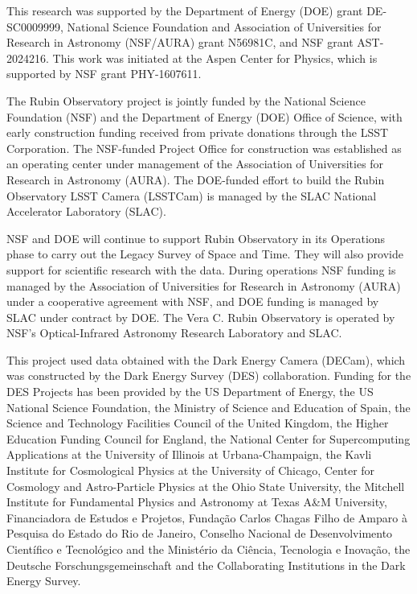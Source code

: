 \documentclass[twocolumn,trackchanges]{aastex63}
\begin{document}
This research was supported by the Department of Energy (DOE) grant DE-SC0009999, National Science Foundation and Association of Universities for Research in Astronomy (NSF/AURA) grant N56981C, and NSF grant AST-2024216. This work was initiated at the Aspen Center for Physics, which is supported by NSF grant PHY-1607611.

The Rubin Observatory project is jointly funded by the National Science Foundation (NSF) and the Department of Energy (DOE) Office of Science, with early construction funding received from private donations through the LSST Corporation. The NSF-funded Project Office for construction was established as an operating center under management of the Association of Universities for Research in Astronomy (AURA). The DOE-funded effort to build the Rubin Observatory LSST Camera (LSSTCam) is managed by the SLAC National Accelerator Laboratory (SLAC). 

NSF and DOE will continue to support Rubin Observatory in its Operations phase to carry out the Legacy Survey of Space and Time. They will also provide support for scientific research with the data. During operations NSF funding is managed by the Association of Universities for Research in Astronomy (AURA) under a cooperative agreement with NSF, and DOE funding is managed by SLAC under contract by DOE. The Vera C. Rubin Observatory is operated by NSF's Optical-Infrared Astronomy Research Laboratory and SLAC.

This project used data obtained with the Dark Energy Camera (DECam), which was constructed by the Dark Energy Survey (DES) collaboration. Funding for the DES Projects has been provided by the US Department of Energy, the US National Science Foundation, the Ministry of Science and Education of Spain, the Science and Technology Facilities Council of the United Kingdom, the Higher Education Funding Council for England, the National Center for Supercomputing Applications at the University of Illinois at Urbana-Champaign, the Kavli Institute for Cosmological Physics at the University of Chicago, Center for Cosmology and Astro-Particle Physics at the Ohio State University, the Mitchell Institute for Fundamental Physics and Astronomy at Texas A\&M University, Financiadora de Estudos e Projetos, Fundação Carlos Chagas Filho de Amparo à Pesquisa do Estado do Rio de Janeiro, Conselho Nacional de Desenvolvimento Científico e Tecnológico and the Ministério da Ciência, Tecnologia e Inovação, the Deutsche Forschungsgemeinschaft and the Collaborating Institutions in the Dark Energy Survey.
\end{document}
